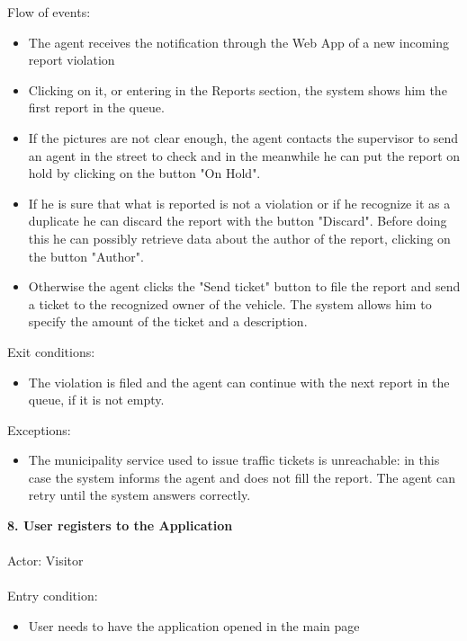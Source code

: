\documentclass[a4paper]{report}
\begin{document}
Flow of events:
\begin{itemize} 
\item The agent receives the notification through the Web App of a new incoming report violation
\item Clicking on it, or entering in the Reports section, the system shows him the first report in the queue.
\item If the pictures are not clear enough, the agent contacts the supervisor to send an agent in the street to check and in the meanwhile he can put the report on hold by clicking on the button "On Hold".
\item If he is sure that what is reported is not a violation or if he recognize it as a duplicate he can discard the report with the button "Discard". Before doing this he can possibly retrieve data about the author of the report, clicking on the button "Author".
\item Otherwise the agent clicks the "Send ticket" button to file the report and send a ticket to the recognized owner of the vehicle. The system allows him to specify the amount of the ticket and a description.
\end{itemize}
Exit conditions:
\begin{itemize}
\item The violation is filed and the agent can continue with the next report in the queue, if it is not empty.
\end{itemize}
Exceptions: 
\begin{itemize}
\item The municipality service used to issue traffic tickets is unreachable: in this case the system informs the agent and does not fill the report. The agent can retry until the system answers correctly.
\end{itemize}
\textbf{8. User registers to the Application}\label{uc:8}
\\ \\
Actor: Visitor \\ \\
Entry condition: 
\begin{itemize}
\item User needs to have the application opened in the main page
\end{itemize}
\end{document}
